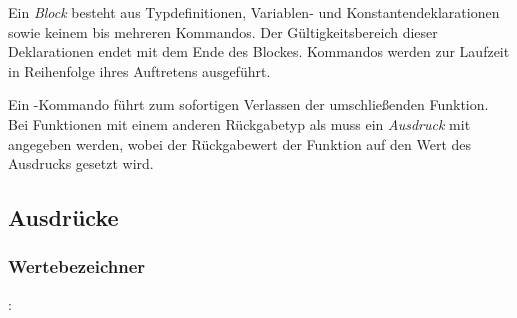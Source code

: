 Ein \emph{Block} besteht aus Typdefinitionen, Variablen- und Konstantendeklarationen sowie keinem bis mehreren Kommandos.
Der Gültigkeitsbereich dieser Deklarationen endet mit dem Ende des Blockes. Kommandos werden zur Laufzeit in Reihenfolge ihres
Auftretens ausgeführt.

Ein -Kommando führt zum sofortigen Verlassen der umschließenden Funktion.
Bei Funktionen mit einem anderen Rückgabetyp als  muss ein \emph{Ausdruck} mit angegeben
werden, wobei der Rückgabewert der Funktion auf den Wert des Ausdrucks gesetzt wird.

\subsection{Ausdrücke}\label{Ausdruecke}
\subsubsection{Wertebezeichner}\label{Wertebezeichner}
:\label{bezeichner_wert}\\
\hspace*{1cm} \\
\hspace*{1cm} \glq\Gt{[}\grq  {}  \glq\Gt{]}\grq \\
\hspace*{1cm}  \\
\hspace*{1cm}  \glq\Gt{[}\grq  {}  \glq\Gt{]}\grq \\
\hspace*{1cm} \\
\hspace*{1cm} \glq\Gt{[}\grq  {}  \glq\Gt{]}\grq \\
\hspace*{1cm}  \\
\hspace*{1cm}  \glq\Gt{[}\grq  {}  \glq\Gt{]}\grq \\

